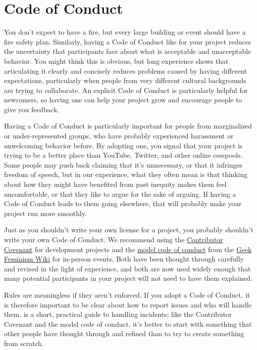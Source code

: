 \section{Code of Conduct}\label{s:collab-conduct}

You don't expect to have a fire,
but every large building or event should have a fire safety plan.
Similarly,
having a Code of Conduct like  for your project
reduces the uncertainty that participants face about what is acceptable and unacceptable behavior.
You might think this is obvious,
but long experience shows that articulating it clearly and concisely reduces problems caused by having different expectations,
particularly when people from very different cultural backgrounds are trying to collaborate.
An explicit Code of Conduct is particularly helpful for newcomers,
so having one can help your project grow
and encourage people to give you feedback.

Having a Code of Conduct is particularly important for people from marginalized or under-represented groups,
who have probably experienced harassment or unwelcoming behavior before.
By adopting one,
you signal that your project is trying to be a better place than YouTube,
Twitter,
and other online cesspools.
Some people may push back claiming that it's unnecessary,
or that it infringes freedom of speech,
but in our experience,
what they often mean is that thinking about how they might have benefited from past inequity makes them feel uncomfortable,
or that they like to argue for the sake of arguing.
If having a Code of Conduct leads to them going elsewhere,
that will probably make your project run more smoothly.

Just as you shouldn't write your own license for a project,
you probably shouldn't write your own Code of Conduct.
We recommend using the \href{https://www.contributor-covenant.org}{Contributor Covenant} for development projects
and the \href{http://geekfeminism.wikia.com/wiki/Conference_anti-harassment/Policy}{model code of conduct} from the \href{http://geekfeminism.wikia.com/}{Geek Feminism Wiki} for in-person events.
Both have been thought through carefully and revised in the light of experience,
and both are now used widely enough that
many potential participants in your project will not need to have them explained.

Rules are meaningless if they aren't enforced.
If you adopt a Code of Conduct,
it is therefore important to be clear about how to report issues and who will handle them.
\cite{Auro2018} is a short, practical guide to handling incidents;
like the Contributor Covenant and the model code of conduct,
it's better to start with something that other people have thought through and refined
than to try to create something from scratch.
